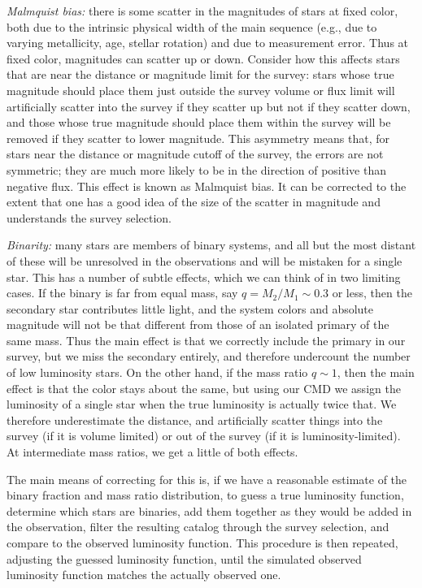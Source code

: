 \textit{Malmquist bias:} there is some scatter in the magnitudes of stars at fixed color, both due to the intrinsic physical width of the main sequence (e.g., due to varying metallicity, age, stellar rotation) and due to measurement error. Thus at fixed color, magnitudes can scatter up or down. Consider how this affects stars that are near the distance or magnitude limit for the survey: stars whose true magnitude should place them just outside the survey volume or flux limit will artificially scatter into the survey if they scatter up but not if they scatter down, and those whose true magnitude should place them within the survey will be removed if they scatter to lower magnitude. This asymmetry means that, for stars near the distance or magnitude cutoff of the survey, the errors are not symmetric; they are much more likely to be in the direction of positive than negative flux. This effect is known as Malmquist bias. It can be corrected to the extent that one has a good idea of the size of the scatter in magnitude and understands the survey selection.

\textit{Binarity:} many stars are members of binary systems, and all but the most distant of these will be unresolved in the observations and will be mistaken for a single star. This has a number of subtle effects, which we can think of in two limiting cases. If the binary is far from equal mass, say $q = M_2/M_1 \sim 0.3$ or less, then the secondary star contributes little light, and the system colors and absolute magnitude will not be that different from those of an isolated primary of the same mass. Thus the main effect is that we correctly include the primary in our survey, but we miss the secondary entirely, and therefore undercount the number of low luminosity stars. On the other hand, if the mass ratio $q\sim 1$, then the main effect is that the color stays about the same, but using our CMD we assign the luminosity of a single star when the true luminosity is actually twice that. We therefore underestimate the distance, and artificially scatter things into the survey (if it is volume limited) or out of the survey (if it is luminosity-limited). At intermediate mass ratios, we get a little of both effects.

The main means of correcting for this is, if we have a reasonable estimate of the binary fraction and mass ratio distribution, to guess a true luminosity function, determine which stars are binaries, add them together as they would be added in the observation, filter the resulting catalog through the survey selection, and compare to the observed luminosity function. This procedure is then repeated, adjusting the guessed luminosity function, until the simulated observed luminosity function matches the actually observed one. 

